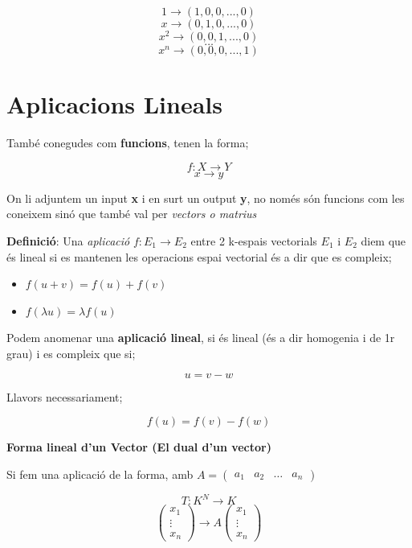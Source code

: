 \documentclass[12pt]{article}
\begin{document}
\[1 \rightarrow (1,0,0,...,0)\]
\[x \rightarrow (0,1,0,...,0)\]
\[x^2 \rightarrow (0,0,1,...,0)\]
\[\dots\]
\[x^n \rightarrow (0,0,0,...,1)\]


\section{Aplicacions Lineals}

També conegudes com \textbf{funcions}, tenen la forma;

\[f: X \rightarrow Y\]
\[x \rightarrow y\]

On li adjuntem un input \textbf{x} i en surt un output \textbf{y}, no només són funcions com les coneixem sinó que també val per \textit{vectors o matrius}

\textbf{Definició}: Una \textit{aplicació} $f: E_1 \rightarrow E_2$ entre 2 k-espais vectorials $E_1$ i $E_2$ diem que és lineal si es mantenen les operacions espai vectorial és a dir que es compleix;

\begin{itemize}
    \item $f(u+v) = f(u) + f(v)$
    \item $f(\lambda u) = \lambda f(u)$
\end{itemize}

Podem anomenar una \textbf{aplicació lineal}, si és lineal (és a dir homogenia i de 1r grau) i es compleix que si;

\[u = v-w\]

Llavors necessariament;

\[f(u) = f(v)- f(w)\]

\textbf{Forma lineal d'un Vector (El dual d'un vector)}

Si fem una aplicació de la forma, amb $A = \begin{pmatrix}
    a_1 & a_2 & \dots & a_n
\end{pmatrix}$

\[T: K^N \rightarrow K\]
\[\begin{pmatrix}
    x_1 \\
    \vdots\\
    x_n
\end{pmatrix} \rightarrow A\begin{pmatrix}
    x_1 \\
    \vdots\\
    x_n
\end{pmatrix}\]
\end{document}

